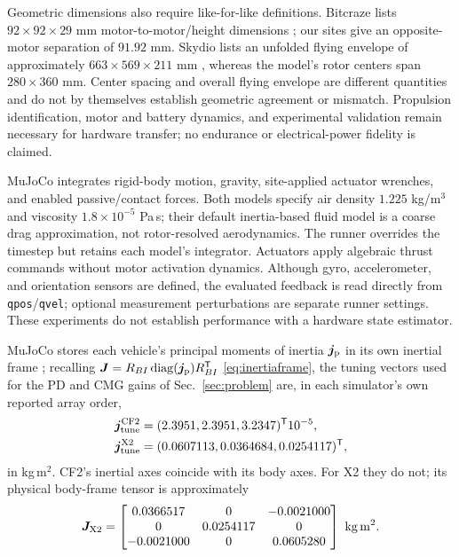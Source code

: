 \documentclass[letterpaper, 10 pt, conference]{ieeeconf}
\newcommand{\T}{^{\mathsf T}}
\begin{document}
Geometric dimensions also require like-for-like definitions. Bitcraze
lists $92\times92\times29$ mm motor-to-motor/height dimensions
\cite{bitcrazeCF20Specs}; our sites give an opposite-motor separation of
$91.92$ mm. Skydio lists an unfolded flying envelope of approximately
$663\times569\times211$ mm \cite{skydioX2ESpecs}, whereas the model's rotor
centers span $280\times360$ mm. Center spacing and overall flying envelope
are different quantities and do not by themselves establish geometric
agreement or mismatch. Propulsion identification, motor and battery
dynamics, and experimental validation remain necessary for hardware
transfer; no endurance or electrical-power fidelity is claimed.

MuJoCo \cite{todorov2012mujoco} integrates rigid-body motion, gravity, site-applied actuator
wrenches, and enabled passive/contact forces. Both models specify air
density $1.225$ kg/m$^3$ and viscosity $1.8\times10^{-5}$ Pa\,s; their
default inertia-based fluid model \cite{mujocoFluid} is a coarse drag approximation, not
rotor-resolved aerodynamics. The runner overrides the timestep but retains
each model's integrator. Actuators apply algebraic thrust commands without
motor activation dynamics. Although gyro, accelerometer, and orientation
sensors are defined, the evaluated feedback is read directly from
\texttt{qpos}/\texttt{qvel}; optional measurement perturbations are separate
runner settings. These experiments do not establish performance with a
hardware state estimator.

MuJoCo stores each vehicle's principal moments of inertia $\bm j_{\rm p}$ in
its own inertial frame \cite{mujocoInertial}; recalling
$\bm J=R_{BI}\operatorname{diag}(\bm j_{\rm p})R_{BI}\T$ \eqref{eq:inertiaframe},
the tuning vectors used for the PD and CMG gains of Sec.~\ref{sec:problem}
are, in each simulator's own reported array order,
\begin{align*}
 \bm j_{\rm tune}^{\rm CF2}&=(2.3951,2.3951,3.2347)\T10^{-5},\\
 \bm j_{\rm tune}^{\rm X2}&=(0.0607113,0.0364684,0.0254117)\T,
\end{align*}
in kg\,m$^2$. CF2's inertial axes coincide with its body axes. For X2
they do not; its physical body-frame tensor is approximately
\begin{equation}
 \bm J_{\rm X2}=\begin{bmatrix}
 0.0366517&0&-0.0021000\\
 0&0.0254117&0\\
 -0.0021000&0&0.0605280
 \end{bmatrix}\ \mathrm{kg\,m^2}.
\end{equation}
\end{document}

